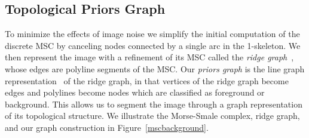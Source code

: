 
\vspace{-.2cm}

\subsection{Topological Priors Graph}
\label{ssec:topograph}

To minimize the effects of image noise we simplify the initial computation of the discrete MSC by canceling nodes connected by a single arc in the 1-skeleton. We then represent the image with a refinement of its MSC called the \textit{ridge graph}~\cite{mcdonald2020improving}, whose edges are polyline segments of the MSC.  Our \textit{priors graph} is the line graph representation~\cite{chen2018supervised} of the ridge graph, in that vertices of the ridge graph become edges and polylines become nodes which are classified as foreground or background.  This allows us to segment the image through a graph representation of its topological structure.  We illustrate the Morse-Smale complex, ridge graph, and our graph construction in Figure~\ref{mscbackground}.%

 

